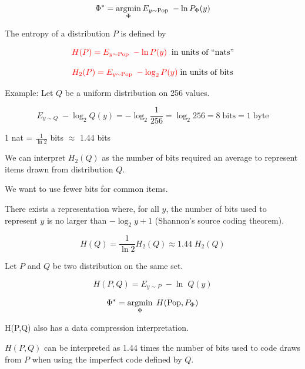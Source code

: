 {

{\color{red} $$\Phi^* = \operatorname*{argmin}_\Phi E_{y \sim \mathrm{Pop}}\;- \ln P_\Phi(y)$$}


The entropy of a distribution $P$ is defined by

$${\color{red} H(P) = E_{y \sim \mathrm{Pop}} \;- \ln P(y)}\;\;\mbox{in units of ``nats''}$$

$${\color{red} H_2(P) = E_{y \sim \mathrm{Pop}} \;- \log_2 P(y)}\; \mbox{in units of bits}$$

\vfill
Example: Let $Q$ be a uniform distribution on 256 values.

$$E_{y \sim Q}\;-\log_2 Q(y) = - \log_2 \frac{1}{256} = \log_2 256 = 8\;\mathrm{bits} = 1\;\mathrm{byte}$$

\vfill
\centerline{\color{red} 1 nat = $\frac{1}{\ln 2}$ bits $\approx$ 1.44 bits}


We can interpret {\color{red} $H_2(Q)$} as the number of bits required an average to represent items drawn from distribution $Q$.

\vfill
We want to use fewer bits for common items.

\vfill
There exists a representation where, for all $y$, the number of bits used to represent $y$ is no larger than $- \log_2 y + 1$ (Shannon's source coding theorem).

\vfill
{\color{red} $$H(Q) = \frac{1}{\ln 2} H_2(Q) \approx 1.44 \; H_2(Q)$$}




Let $P$ and $Q$ be two distribution on the same set.

{\color{red} $$H(P,Q) = E_{y \sim P} \;-\ln \;Q(y)$$}

{\color{red} $$\Phi^* = \operatorname*{argmin}_\Phi \;H(\mathrm{Pop},P_\Phi)$$}

\vfill
{\color{red} H(P,Q)} also has a data compression interpretation.

\vfill
{\color{red} $H(P,Q)$} can be interpreted as 1.44 times the number of bits used to code draws from $P$ when using the imperfect code defined by $Q$.

}
